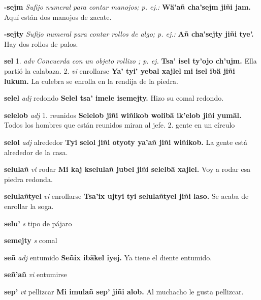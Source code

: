 \documentclass[10pt]{scrbook}
\newcommand{\entry}[1]{\textbf{#1}}
\newcommand{\onedefinition}[1]{#1.}
\newcommand{\nontranslationdef}[1]{\textit{#1}}
\newcommand{\partofspeech}[1]{\textit{#1}}
\newcommand{\spanishtranslation}[1]{#1}
\newcommand{\cholexample}[1]{\textbf{#1}}
\newcommand{\exampletranslation}[1]{#1}
\begin{document}
\begin{multicols}{2}
\entry{-sejm}
\nontranslationdef{Sufijo numeral para contar manojos; p. ej.:}
\cholexample{Wä'añ cha'sejm jiñi jam.}
\exampletranslation{Aquí están dos manojos de zacate.}

\entry{-sejty}
\nontranslationdef{Sufijo numeral para contar rollos de algo; p. ej.:}
\cholexample{Añ cha'sejty jiñi tye'.}
\exampletranslation{Hay dos rollos de palos.}

\entry{sel}
\onedefinition{1}
\partofspeech{adv}
\nontranslationdef{Concuerda con un objeto rollizo ; p. ej.}
\cholexample{Tsa' isel ty'ojo ch'ujm.}
\exampletranslation{Ella partió la calabaza.}
\onedefinition{2}
\partofspeech{vi}
\spanishtranslation{enrollarse}
\cholexample{Ya' tyi' yebal xajlel mi isel ibä jiñi lukum.}
\exampletranslation{La culebra se enrolla en la rendija de la piedra.}

\entry{selel}
\partofspeech{adj}
\spanishtranslation{redondo}
\cholexample{Selel tsa' imele isemejty.}
\exampletranslation{Hizo su comal redondo.}

\entry{selelob}
\partofspeech{adj}
\onedefinition{1}
\spanishtranslation{reunidos}
\cholexample{Selelob jiñi wiñikob wolibä ik'elob jiñi yumäl.}
\exampletranslation{Todos los hombres que están reunidos miran al jefe.}
\onedefinition{2}
\spanishtranslation{gente en un círculo}

\entry{selol}
\partofspeech{adj}
\spanishtranslation{alrededor}
\cholexample{Tyi selol jiñi otyoty ya'añ jiñi wiñikob.}
\exampletranslation{La gente está alrededor de la casa.}

\entry{selulañ}
\partofspeech{vt}
\spanishtranslation{rodar}
\cholexample{Mi kaj kselulañ jubel jiñi selelbä xajlel.}
\exampletranslation{Voy a rodar esa piedra redonda.}

\entry{selulañtyel}
\partofspeech{vi}
\spanishtranslation{enrollarse}
\cholexample{Tsa'ix ujtyi tyi selulañtyel jiñi laso.}
\exampletranslation{Se acaba de enrollar la soga.}

\entry{selu'}
\partofspeech{s}
\spanishtranslation{tipo de pájaro}

\entry{semejty}
\partofspeech{s}
\spanishtranslation{comal}

\entry{señ}
\partofspeech{adj}
\spanishtranslation{entumido}
\cholexample{Señix ibäkel iyej.}
\exampletranslation{Ya tiene el diente entumido.}

\entry{señ'añ}
\partofspeech{vi}
\spanishtranslation{entumirse}

\entry{sep'}
\partofspeech{vt}
\spanishtranslation{pellizcar}
\cholexample{Mi imulañ sep' jiñi alob.}
\exampletranslation{Al muchacho le gusta pellizcar.}


\end{multicols}
\end{document}
